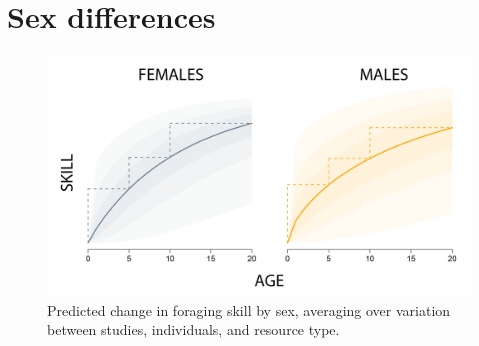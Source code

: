 \section{Sex differences}\label{SI:sex_diff}


\begin{figure}[h]
\centering
\includegraphics[width=12cm] {text/images/sex_diffs.png}
\caption{ Predicted change in foraging skill by sex, averaging over variation between studies, individuals, and resource type.}
\label{fig:sex_diffs}
\end{figure}

